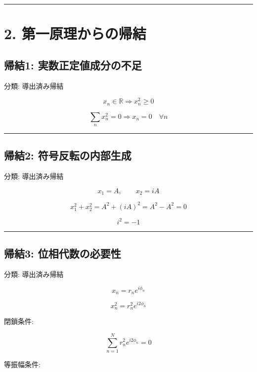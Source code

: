 \documentclass[
  a4paper,
]{ltjsarticle}
\begin{document}
\begin{center}\rule{0.5\linewidth}{0.5pt}\end{center}

\section{2.
第一原理からの帰結}\label{ux7b2cux4e00ux539fux7406ux304bux3089ux306eux5e30ux7d50}

\subsection{帰結1:
実数正定値成分の不足}\label{ux5e30ux7d501-ux5b9fux6570ux6b63ux5b9aux5024ux6210ux5206ux306eux4e0dux8db3}

分類: 導出済み帰結

\[
x_n\in\mathbb{R}
\Rightarrow
x_n^2\ge0
\]

\[
\sum_n x_n^2=0
\Rightarrow
x_n=0\quad\forall n
\]

\begin{center}\rule{0.5\linewidth}{0.5pt}\end{center}

\subsection{帰結2:
符号反転の内部生成}\label{ux5e30ux7d502-ux7b26ux53f7ux53cdux8ee2ux306eux5185ux90e8ux751fux6210}

分類: 導出済み帰結

\[
x_1=A,\qquad x_2=iA
\]

\[
x_1^2+x_2^2=A^2+(iA)^2=A^2-A^2=0
\]

\[
i^2=-1
\]

\begin{center}\rule{0.5\linewidth}{0.5pt}\end{center}

\subsection{帰結3:
位相代数の必要性}\label{ux5e30ux7d503-ux4f4dux76f8ux4ee3ux6570ux306eux5fc5ux8981ux6027}

分類: 導出済み帰結

\[
x_n=r_n e^{i\phi_n}
\]

\[
x_n^2=r_n^2e^{i2\phi_n}
\]

閉鎖条件:

\[
\sum_{n=1}^{N}r_n^2e^{i2\phi_n}=0
\]

等振幅条件:
\end{document}
